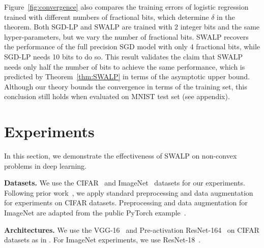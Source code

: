 \documentclass{article}
\begin{document}
Figure~\ref{fig:convergence} also compares the training errors of logistic regression trained with different numbers of fractional bits, which determine $\delta$ in the theorem. 
Both SGD-LP and SWALP are trained with 2 integer bits and the same hyper-parameters, but we vary the number of fractional bits.
SWALP recovers the performance of the full precision SGD model with only 4 fractional bits, while SGD-LP needs 10 bits to do so.
This result validates the claim that SWALP needs only half the number of bits to achieve the same performance, which is predicted by Theorem~\ref{thm:SWALP} in terms of the asymptotic upper bound.
Although our theory bounds the convergence in terms of the training set, this conclusion still holds when evaluated on MNIST test set (see appendix). 



\section{Experiments}\label{sec:expr}

In this section, we demonstrate the effectiveness of SWALP on non-convex problems in deep learning.

\textbf{Datasets.} 
We use the CIFAR~\cite{CIFAR10} and ImageNet~\cite{imagenet} datasets for our experiments.
Following prior work~\cite{SWA, WAGE}, we apply standard preprocessing and data augmentation for experiments on CIFAR datasets.
Preprocessing and data augmentation for ImageNet are adapted from the public PyTorch example~\cite{PyTorch}.


\textbf{Architectures.} 
We use the VGG-16~\cite{VGG} and Pre-activation ResNet-164~\cite{preact-resnet} on CIFAR datasets as in \citet{SWA, SWA-repo}.
For ImageNet experiments, we use ResNet-18~\cite{resnet}.
\end{document}
